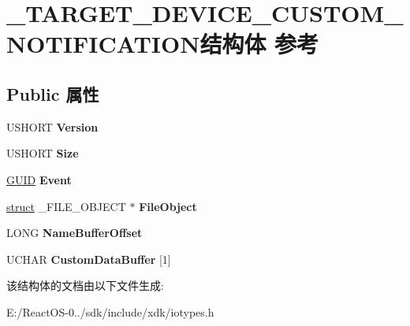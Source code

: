 \hypertarget{struct___t_a_r_g_e_t___d_e_v_i_c_e___c_u_s_t_o_m___n_o_t_i_f_i_c_a_t_i_o_n}{}\section{\+\_\+\+T\+A\+R\+G\+E\+T\+\_\+\+D\+E\+V\+I\+C\+E\+\_\+\+C\+U\+S\+T\+O\+M\+\_\+\+N\+O\+T\+I\+F\+I\+C\+A\+T\+I\+O\+N结构体 参考}
\label{struct___t_a_r_g_e_t___d_e_v_i_c_e___c_u_s_t_o_m___n_o_t_i_f_i_c_a_t_i_o_n}
\subsection*{Public 属性}
\begin{DoxyCompactItemize}
\item 
\mbox{\label{struct___t_a_r_g_e_t___d_e_v_i_c_e___c_u_s_t_o_m___n_o_t_i_f_i_c_a_t_i_o_n_ab95af376d973000bf374c2f6aba3520e}} 
U\+S\+H\+O\+RT {\bfseries Version}
\item 
\mbox{\label{struct___t_a_r_g_e_t___d_e_v_i_c_e___c_u_s_t_o_m___n_o_t_i_f_i_c_a_t_i_o_n_a28a01af4f085690f9d77df5fbb7a5563}} 
U\+S\+H\+O\+RT {\bfseries Size}
\item 
\mbox{\label{struct___t_a_r_g_e_t___d_e_v_i_c_e___c_u_s_t_o_m___n_o_t_i_f_i_c_a_t_i_o_n_a7880619f2e856433cc9f8b4974a4d31d}} 
\hyperlink{interface_g_u_i_d}{G\+U\+ID} {\bfseries Event}
\item 
\mbox{\label{struct___t_a_r_g_e_t___d_e_v_i_c_e___c_u_s_t_o_m___n_o_t_i_f_i_c_a_t_i_o_n_ae10180ef6e89a660669bc2bbda21b40c}} 
\hyperlink{interfacestruct}{struct} \+\_\+\+F\+I\+L\+E\+\_\+\+O\+B\+J\+E\+CT $\ast$ {\bfseries File\+Object}
\item 
\mbox{\label{struct___t_a_r_g_e_t___d_e_v_i_c_e___c_u_s_t_o_m___n_o_t_i_f_i_c_a_t_i_o_n_a411a0e78e00f050ce01b2431371493dc}} 
L\+O\+NG {\bfseries Name\+Buffer\+Offset}
\item 
\mbox{\label{struct___t_a_r_g_e_t___d_e_v_i_c_e___c_u_s_t_o_m___n_o_t_i_f_i_c_a_t_i_o_n_a25e0308a8703bcea7c6c8b87036d16e6}} 
U\+C\+H\+AR {\bfseries Custom\+Data\+Buffer} \mbox{[}1\mbox{]}
\end{DoxyCompactItemize}


该结构体的文档由以下文件生成\+:\begin{DoxyCompactItemize}
\item 
E\+:/\+React\+O\+S-\/0../sdk/include/xdk/iotypes.\+h\end{DoxyCompactItemize}
